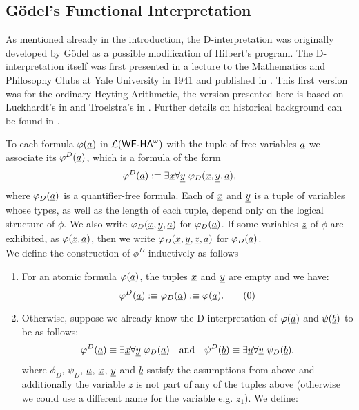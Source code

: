 \subsection{G\"odel's Functional Interpretation}
%
%
%
As mentioned already in the introduction, the D-interpretation
was originally developed by G\"odel as a possible modification
of Hilbert's program. The D-interpretation itself was first
presented in a lecture to the Mathematics and Philosophy
Clubs at Yale University in 1941 and published in \cite{Goedel58}.
This first version was for the ordinary Heyting Arithmetic, the version presented
here is based on Luckhardt's in \cite{Luckhardt73} and Troelstra's
in \cite{Troelstra73}.
Further details on historical 
background can be found
in \cite{AF98}. 
\begin{dfn}[G\"odel '41] \label{d:FId}
To each formula $\varphi(\underline{a})$ in ${\mathcal L}({\textsf{\upshape WE-HA}}^{\omega})$ with the tuple of
free variables $\underline{a}$ we associate its 
$\varphi^D(\underline{a})$, which is a formula of the form
\[
\varphi^D(\underline{a}):\equiv\exists \underline x\forall \underline y\ \varphi_D(\underline x, \underline y, \underline{a})
\text{,}
\]
where $\varphi_D(\underline{a})$ is a quantifier-free formula.
Each of $\underline x$ and $\underline y$ is a tuple of variables whose
types, as well
as the length of each tuple, depend only on the logical structure of $\phi$. 
We also write $\varphi_D(\underline x, \underline y, \underline{a})$ for $\varphi_D(\underline{a})$. If some variables
$\underline z$ of $\phi$ are exhibited, as $\varphi(\underline z,\underline a)$, then we write
$\varphi_D(\underline x, \underline y, \underline z,\underline{a})$ for $\varphi_D(\underline{a})$.\\
We define the construction of $\phi^D$ inductively as follows 
\begin{enumerate}
\item For an atomic formula $\varphi(\underline{a})$, the tuples $\underline x$ and $\underline y$ are empty
and we have:
\[
\varphi^D(\underline{a}):\equiv\varphi_D(\underline{a}):\equiv\varphi(\underline{a})\text{.}
\tag{0}
\]
\item Otherwise, suppose we already know the D-interpretation of $\varphi(\underline a)$ 
and $\psi(\underline b)$ to be as follows:
\[
\varphi^D(\underline{a})\equiv\exists \underline x\forall \underline y\ \varphi_D(\underline{a})
\quad\text{and}\quad
\psi^D(\underline{b})\equiv\exists \underline u\forall \underline v\ \psi_D(\underline{b})
\text{.}
\]
where $\phi_D$, $\psi_D$, $\underline{a}$, $\underline x$, $\underline y$ and $\underline{b}$ satisfy the
assumptions from above and additionally the variable $z$ is not part of any of 
the tuples above (otherwise we could use
a different name for the variable e.g. $z_1$). We define:
\setcounter{equation}{0}
\begin{align}

\end{align}
\end{enumerate}
\end{dfn}
